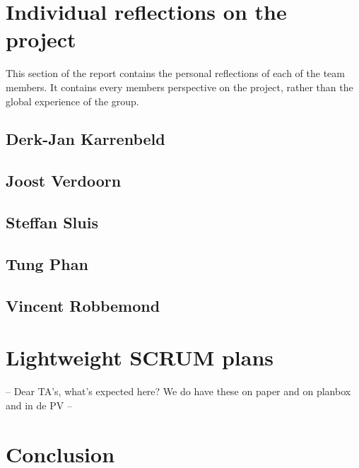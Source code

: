 \documentclass[10pt,a4paper]{report}
\begin{document}
	\section{Individual reflections on the project}
		This section of the report contains the personal reflections of each of the team members. It contains every members perspective on the project, rather than the global experience of the group.
		\subsection{Derk-Jan Karrenbeld}
			
		\subsection{Joost Verdoorn}
			
		\subsection{Steffan Sluis}
			
		\subsection{Tung Phan}
			
		\subsection{Vincent Robbemond}
			
		
	\section{Lightweight SCRUM plans}
		-- Dear TA's, what's expected here? We do have these on paper and on planbox and in de PV --
	
		
	\section{Conclusion}
	
\end{document}

